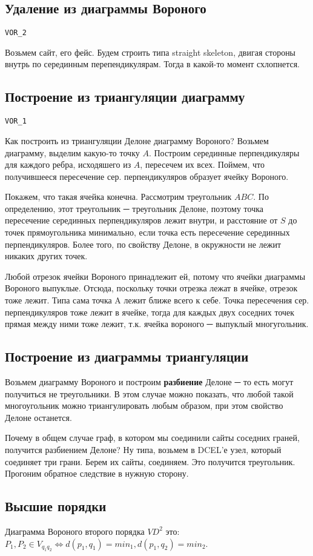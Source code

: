 \documentclass[11pt]{article}
\begin{document}
\subsection{Удаление из диаграммы Вороного}
\label{sec-24-2}
\verb~VOR_2~

Возьмем сайт, его фейс. Будем строить типа straight skeleton,
двигая стороны внутрь по серединным перепендикулярам. Тогда в
какой-то момент схлопнется.
\subsection{Построение из триангуляции диаграмму}
\label{sec-24-3}
\verb~VOR_1~

Как построить из триангуляции Делоне диаграмму Вороного?  Возьмем
диаграмму, выделим какую-то точку $A$. Построим серединные
перпендикуляры для каждого ребра, исходяшего из $A$, пересечем их
всех. Поймем, что получившееся пересечение сер. перпендикуляров
образует ячейку Вороного.

Покажем, что такая ячейка конечна. Рассмотрим треугольник $ABC$. По
определению, этот треугольник ─ треугольник Делоне, поэтому точка
пересечение серединных перпендикуляров лежит внутри, и расстояние
от $S$ до точек прямоугольника минимально, если точка есть
пересечение серединных перпендикуляров. Более того, по свойству
Делоне, в окружности не лежит никаких других точек.

Любой отрезок ячейки Вороного принадлежит ей, потому что ячейки
диаграммы Вороного выпуклые. Отсюда, поскольку точки отрезка лежат в
ячейке, отрезок тоже лежит. Типа сама точка A лежит ближе всего к
себе. Точка пересечения сер. перпендикуляров тоже лежит в ячейке,
тогда для каждых двух соседних точек прямая между ними тоже лежит,
т.к. ячейка вороного ─ выпуклый многугольник.
\subsection{Построение из диаграммы триангуляции}
\label{sec-24-4}
Возьмем диаграмму Вороного и построим \textbf{разбиение} Делоне ─ то есть
могут получиться не треугольники. В этом случае можно показать, что
любой такой многоугольник можно триангулировать любым образом, при
этом свойство Делоне останется.

Почему в общем случае граф, в котором мы соединили сайты соседних
граней, получится разбиением Делоне? Ну типа, возьмем в DCEL'е
узел, который соединяет три грани. Берем их сайты, соединяем. Это
получится треугольник. Прогоним обратное следствие в нужную
сторону.
\subsection{Высшие порядки}
\label{sec-24-5}
Диаграмма Вороного второго порядка $VD^2$ это: $P_1, P_2 \in
   V_{q_1q_2} ⇔ d(p_1, q_1) = min_1, d(p_1,q_2) = min_2$.
\end{document}

